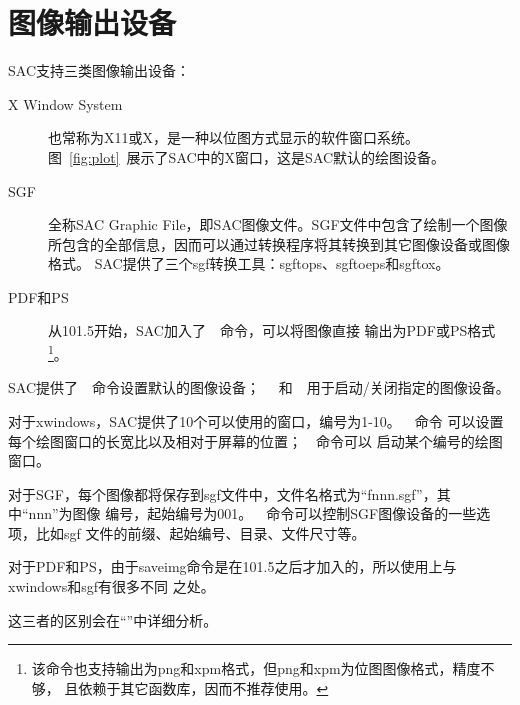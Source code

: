 \section{图像输出设备}
SAC支持三类图像输出设备：
\begin{description}
\item [X Window System] 也常称为X11或X，是一种以位图方式显示的软件窗口系统。
    图~\ref{fig:plot}~展示了SAC中的X窗口，这是SAC默认的绘图设备。
\item [SGF] 全称SAC Graphic File，即SAC图像文件。SGF文件中包含了绘制一个图像
    所包含的全部信息，因而可以通过转换程序将其转换到其它图像设备或图像格式。
    SAC提供了三个sgf转换工具：sgftops、sgftoeps和sgftox。
\item [PDF和PS] 从101.5开始，SAC加入了~~命令，可以将图像直接
    输出为PDF或PS格式
    \footnote{该命令也支持输出为png和xpm格式，但png和xpm为位图图像格式，精度不够，
    且依赖于其它函数库，因而不推荐使用。}。
\end{description}

SAC提供了~~命令设置默认的图像设备；~~
和~~用于启动/关闭指定的图像设备。

对于xwindows，SAC提供了10个可以使用的窗口，编号为1-10。~~命令
可以设置每个绘图窗口的长宽比以及相对于屏幕的位置；~~命令可以
启动某个编号的绘图窗口。

对于SGF，每个图像都将保存到sgf文件中，文件名格式为``fnnn.sgf''，其中``nnn''为图像
编号，起始编号为001。~~命令可以控制SGF图像设备的一些选项，比如sgf
文件的前缀、起始编号、目录、文件尺寸等。

对于PDF和PS，由于saveimg命令是在101.5之后才加入的，所以使用上与xwindows和sgf有很多不同
之处。

这三者的区别会在``''中详细分析。
